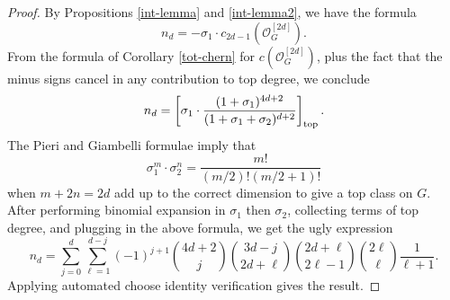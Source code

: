 \documentclass{amsart}
\theoremstyle{definition}
\begin{document}
\begin{proof} By Propositions \ref{int-lemma} and \ref{int-lemma2}, 
we have the formula 
$$n_d=-\sigma_1\cdot c_{2d-1}(\mathcal{O}_G^{[2d]}).$$ From the formula of
Corollary \ref{tot-chern} for
$c(\mathcal{O}_G^{[2d]})$, plus the fact that the minus signs cancel
in any contribution to top degree, we conclude
$$n_d = \left[\sigma_1\cdot
\frac{(1+\sigma_1)^{4d+2}}{(1+\sigma_1+\sigma_2)^{d+2}}\right]_{\rm top}.$$ 
The Pieri and Giambelli formulae imply that
$$\sigma_1^m\cdot \sigma_2^n = \frac{m!}{(m/2)!(m/2+1)!}$$
when $m+2n=2d$ add up to the correct dimension to give a top class on $G$.
After performing binomial expansion in $\sigma_1$ then $\sigma_2$,
collecting terms of top degree,
and plugging in the above formula, we get the ugly expression
$$n_d=
\sum_{j=0}^d\sum_{\ell=1}^{d-j} (-1)^{j+1}{4d+2\choose j} 
{3d-j \choose 2d+\ell}{2d+\ell \choose 2\ell-1}
{2\ell \choose \ell}\frac{1}{\ell+1}.$$ Applying
automated choose identity verification gives the result.

\end{proof}
\end{document}
